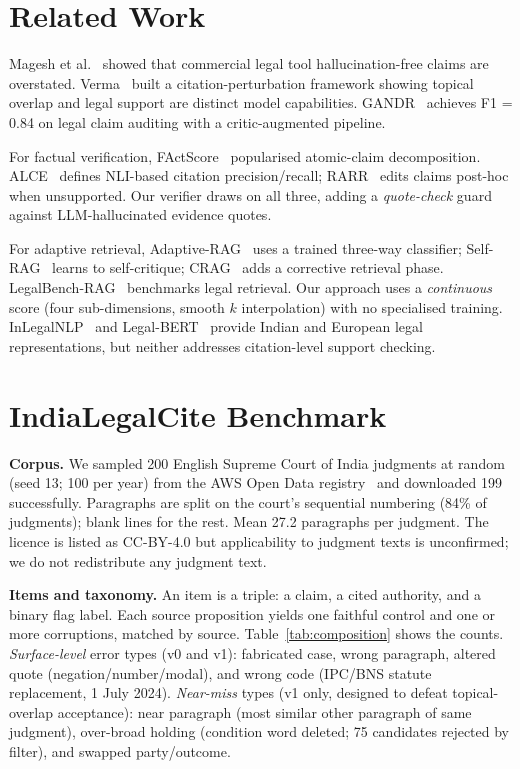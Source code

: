 \documentclass[conference]{IEEEtran}
\begin{document}
\section{Related Work}
\label{sec:related}

Magesh et al.~\cite{magesh2025hallucination} showed that commercial legal tool hallucination-free
claims are overstated. Verma~\cite{verma2026citation} built a citation-perturbation framework
showing topical overlap and legal support are distinct model capabilities. GANDR~\cite{qian2026gandr}
achieves F1 = 0.84 on legal claim auditing with a critic-augmented pipeline.

For factual verification, FActScore~\cite{min2023factscore} popularised atomic-claim decomposition.
ALCE~\cite{gao2023alce} defines NLI-based citation precision/recall; RARR~\cite{gao2023rarr} edits
claims post-hoc when unsupported. Our verifier draws on all three, adding a \emph{quote-check}
guard against LLM-hallucinated evidence quotes.

For adaptive retrieval, Adaptive-RAG~\cite{jeong2024adaptiverag} uses a trained three-way
classifier; Self-RAG~\cite{asai2024selfrag} learns to self-critique; CRAG~\cite{yan2024crag} adds
a corrective retrieval phase. LegalBench-RAG~\cite{pipitone2024legalbench} benchmarks legal
retrieval. Our approach uses a \emph{continuous} score (four sub-dimensions, smooth $k$
interpolation) with no specialised training. InLegalNLP~\cite{paul2022inlegal} and
Legal-BERT~\cite{chalkidis2020legalbert} provide Indian and European legal representations, but
neither addresses citation-level support checking.

\section{IndiaLegalCite Benchmark}
\label{sec:benchmark}

\textbf{Corpus.} We sampled 200 English Supreme Court of India judgments at random (seed 13;
100 per year) from the AWS Open Data registry~\cite{indiansc2026} and downloaded 199 successfully.
Paragraphs are split on the court's sequential numbering (84\% of judgments); blank lines for the
rest. Mean 27.2 paragraphs per judgment. The licence is listed as CC-BY-4.0 but applicability to
judgment texts is unconfirmed; we do not redistribute any judgment text.

\textbf{Items and taxonomy.} An item is a triple: a claim, a cited authority, and a binary flag
label. Each source proposition yields one faithful control and one or more corruptions, matched
by source. Table~\ref{tab:composition} shows the counts. \emph{Surface-level} error types (v0 and
v1): fabricated case, wrong paragraph, altered quote (negation/number/modal), and wrong
code (IPC/BNS statute replacement, 1 July 2024). \emph{Near-miss} types (v1 only, designed to
defeat topical-overlap acceptance): near paragraph (most similar other paragraph of same judgment),
over-broad holding (condition word deleted; 75 candidates rejected by filter), and swapped
party/outcome.
\end{document}
